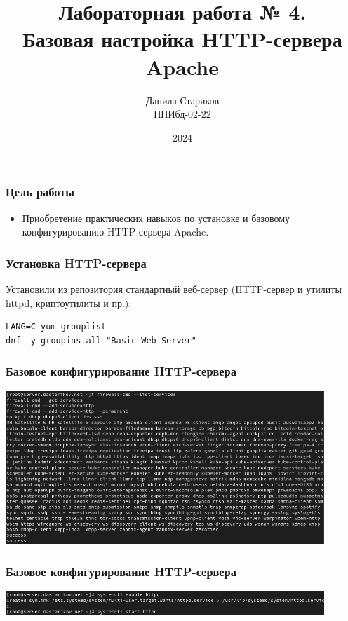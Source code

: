 

\title{Лабораторная работа № 4. \\Базовая настройка HTTP-сервера Apache}
\author{Данила Стариков \\ НПИбд-02-22}
\date{2024}



\frame{\titlepage}

\begin{frame}
\frametitle{Цель работы}
\begin{itemize}
    \item Приобретение практических навыков по установке и базовому конфигурированию HTTP-сервера Apache.
\end{itemize}
\end{frame}

\begin{frame}[containsverbatim]
\frametitle{Установка HTTP-сервера}
 Установили из репозитория стандартный веб-сервер (HTTP-сервер и утилиты httpd, криптоутилиты и пр.):
\begin{verbatim}
LANG=C yum grouplist
dnf -y groupinstall "Basic Web Server"
\end{verbatim}
\end{frame}


\begin{frame}
\frametitle{Базовое конфигурирование HTTP-сервера}
    \centering
    \includegraphics[width=0.9\textwidth]{../images/image01.png}
\end{frame}

\begin{frame}
\frametitle{Базовое конфигурирование HTTP-сервера}
    \centering
    \includegraphics[width=0.9\textwidth]{../images/image02.png}
\end{frame}

